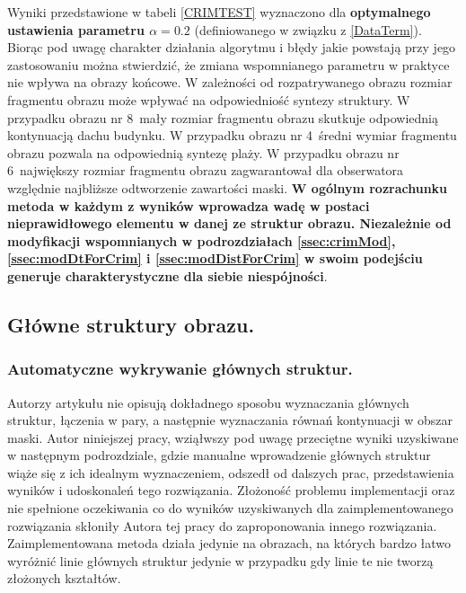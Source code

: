 \documentclass[a4paper,12pt,twoside,openany]{report}
\def \ObrIVmu{obrazu nr 4}
\def \ObrVImu{obrazu nr 6}
\def \ObrXVIImu{obrazu nr 8}
\begin{document}
Wyniki przedstawione w tabeli \ref{CRIMTEST} wyznaczono dla \textbf{optymalnego ustawienia parametru $\alpha=0.2$} (definiowanego w związku z \eqref{DataTerm}). Biorąc pod uwagę charakter działania algorytmu i błędy jakie powstają przy jego zastosowaniu można stwierdzić, że zmiana wspomnianego parametru w praktyce nie wpływa na obrazy końcowe. W zależności od rozpatrywanego obrazu rozmiar fragmentu obrazu może wpływać na odpowiedniość syntezy struktury. W przypadku \ObrXVIImu \ mały rozmiar fragmentu obrazu skutkuje odpowiednią kontynuacją dachu budynku. W przypadku \ObrIVmu \ średni wymiar fragmentu obrazu pozwala na odpowiednią syntezę plaży. W przypadku  \ObrVImu \ największy rozmiar fragmentu obrazu zagwarantował dla obserwatora względnie najbliższe odtworzenie zawartości maski. \textbf{W ogólnym rozrachunku metoda w każdym z wyników wprowadza wadę w postaci nieprawidłowego elementu w danej ze struktur obrazu. Niezależnie od modyfikacji wspomnianych w podrozdziałach \ref{ssec:crimMod}, \ref{ssec:modDtForCrim} i \ref{ssec:modDistForCrim} w swoim podejściu generuje charakterystyczne dla siebie niespójności}.
\subsection{Główne struktury obrazu.}
\subsubsection{Automatyczne wykrywanie głównych struktur.}
Autorzy artykułu \cite{SalientStrucTexProp} nie opisują dokładnego sposobu wyznaczania głównych struktur, łączenia w pary, a następnie wyznaczania równań kontynuacji w obszar maski. Autor niniejszej pracy, wziąłwszy pod uwagę przeciętne wyniki uzyskiwane w następnym podrozdziale, gdzie manualne wprowadzenie głównych struktur wiąże się z ich idealnym wyznaczeniem, odszedł od dalszych prac, przedstawienia wyników i udoskonaleń tego rozwiązania.
Złożoność problemu implementacji oraz nie spełnione oczekiwania co do wyników uzyskiwanych dla zaimplementowanego rozwiązania skłoniły Autora tej pracy do zaproponowania innego rozwiązania. Zaimplementowana metoda działa jedynie na obrazach, na których bardzo łatwo wyróżnić linie głównych struktur jedynie w przypadku gdy linie te nie tworzą złożonych kształtów.
\end{document}
